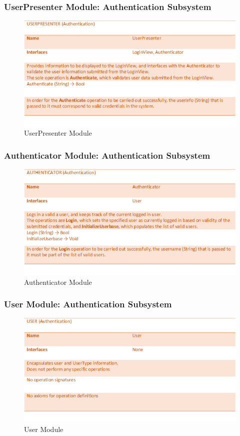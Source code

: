 \documentclass[12pt]{article}
\begin{document}
\subsubsection{UserPresenter Module: Authentication Subsystem}
\begin{figure}[h!]
    \centering
    \includegraphics[scale=0.9]{2_2_3_userpresenter_(authentication)}
    \caption{UserPresenter Module}
\end{figure}

\subsubsection{Authenticator Module: Authentication Subsystem}
\begin{figure}[h!]
    \centering
    \includegraphics[scale=0.9]{2_2_4_authenticator_(authentication)}
    \caption{Authenticator Module}
\end{figure}

\subsubsection{User Module: Authentication Subsystem}
\begin{figure}[h!]
    \centering
    \includegraphics[scale=0.9]{2_2_5_user_(authentication)}
    \caption{User Module}
\end{figure}
\clearpage
\end{document}

